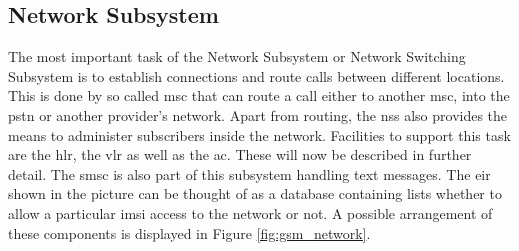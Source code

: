 \begin{table}
\centering
{}
\hspace{.5cm}
\caption{Mobile Country and Network Codes. (R) denotes that the MCC is reserved but not operational as of yet, whereas (T) denotes a operational test network.}
\label{tab:countrycodes}
\end{table}

\subsection{Network Subsystem}
\label{sec:nss}
The most important task of the Network Subsystem or Network Switching Subsystem is to establish connections and route calls between different locations.
This is done by so called \gls{msc} that can route a call either to another \gls{msc}, into the \gls{pstn} or another provider's network.
Apart from routing, the \gls{nss} also provides the means to administer subscribers inside the network.
Facilities to support this task are the \gls{hlr}, the \gls{vlr} as well as the \gls{ac}.
These will now be described in further detail.
The \gls{smsc} is also part of this subsystem handling text messages.
The \gls{eir} shown in the picture can be thought of as a database containing lists whether to allow a particular \gls{imsi} access to the network or not.
A possible arrangement of these components is displayed in Figure \ref{fig:gsm_network}.

